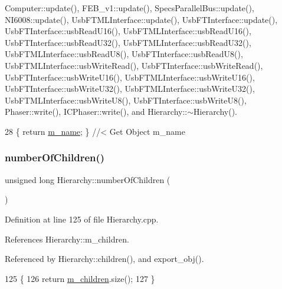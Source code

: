 Computer\+::update(), F\+E\+B\+\_\+v1\+::update(), Specs\+Parallel\+Bus\+::update(), N\+I6008\+::update(), Usb\+F\+T\+M\+L\+Interface\+::update(), Usb\+F\+T\+Interface\+::update(), Usb\+F\+T\+Interface\+::usb\+Read\+U16(), Usb\+F\+T\+M\+L\+Interface\+::usb\+Read\+U16(), Usb\+F\+T\+Interface\+::usb\+Read\+U32(), Usb\+F\+T\+M\+L\+Interface\+::usb\+Read\+U32(), Usb\+F\+T\+M\+L\+Interface\+::usb\+Read\+U8(), Usb\+F\+T\+Interface\+::usb\+Read\+U8(), Usb\+F\+T\+M\+L\+Interface\+::usb\+Write\+Read(), Usb\+F\+T\+Interface\+::usb\+Write\+Read(), Usb\+F\+T\+Interface\+::usb\+Write\+U16(), Usb\+F\+T\+M\+L\+Interface\+::usb\+Write\+U16(), Usb\+F\+T\+Interface\+::usb\+Write\+U32(), Usb\+F\+T\+M\+L\+Interface\+::usb\+Write\+U32(), Usb\+F\+T\+M\+L\+Interface\+::usb\+Write\+U8(), Usb\+F\+T\+Interface\+::usb\+Write\+U8(), Phaser\+::write(), I\+C\+Phaser\+::write(), and Hierarchy\+::$\sim$\+Hierarchy().


\begin{DoxyCode}
28 \{ \textcolor{keywordflow}{return} \hyperlink{classObject_a8b83c95c705d2c3ba0d081fe1710f48d}{m\_name}; \} \textcolor{comment}{//< Get Object m\_name}
\end{DoxyCode}
\mbox{\label{classHierarchy_ab16e84de65fd84e14001a6cf941c8be4}} 
\subsubsection{\texorpdfstring{number\+Of\+Children()}{numberOfChildren()}}
{\footnotesize\ttfamily unsigned long Hierarchy\+::number\+Of\+Children (\begin{DoxyParamCaption}{ }\end{DoxyParamCaption})\hspace{0.3cm}{\ttfamily [inherited]}}



Definition at line 125 of file Hierarchy.\+cpp.



References Hierarchy\+::m\+\_\+children.



Referenced by Hierarchy\+::children(), and export\+\_\+obj().


\begin{DoxyCode}
125                                            \{
126   \textcolor{keywordflow}{return} \hyperlink{classHierarchy_a038816763941fd4a930504917f60483b}{m\_children}.size();
127 \}
\end{DoxyCode}
\mbox{\label{classHierarchy_aee461dc930ce3871636ff87f075b1b83}} 

